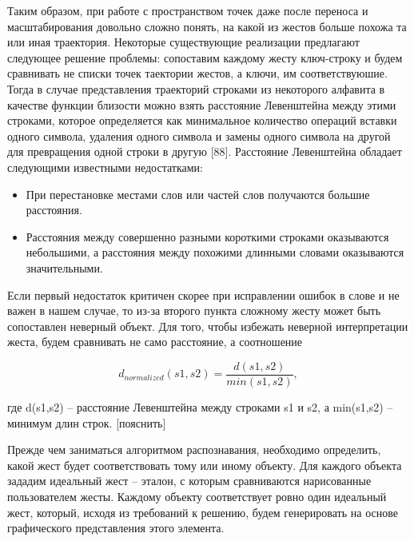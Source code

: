 \documentclass[a5paper]{article}
\begin{document}
Таким образом, при работе с пространством точек даже после переноса и масштабирования довольно сложно понять, на какой из жестов 
больше похожа та или иная траектория. Некоторые существующие реализации предлагают следующее решение проблемы: сопоставим каждому жесту 
ключ-строку и будем сравнивать не списки точек таектории жестов, а ключи, им соответствуюшие. Тогда в случае представления траекторий 
строками из некоторого алфавита в качестве функции близости можно взять расстояние Левенштейна 
между этими строками, которое определяется как минимальное количество операций вставки одного символа, удаления одного символа и замены 
одного символа на другой для превращения одной строки в другую [88]. Расстояние Левенштейна обладает следующими известными недостатками:
\begin{itemize}
  \item При перестановке местами слов или частей слов получаются большие расстояния.
  \item Расстояния между совершенно разными короткими строками оказываются небольшими, а расстояния между похожими длинными словами 
оказываются значительными.
\end{itemize}
Если первый недостаток критичен скорее при исправлении ошибок в слове и не важен в нашем случае, то из-за второго пункта сложному 
жесту может быть сопоставлен неверный объект. Для того, чтобы избежать неверной интерпретации жеста, будем сравнивать не само расстояние, 
а соотношение 

\begin{equation}
\label{levenshtein}
d_{normalized}(s1,s2) = \frac{d(s1,s2)}{min(s1,s2)},
\end{equation}

где d(s1,s2) -- расстояние Левенштейна между строками s1 и s2, а min(s1,s2) -- минимум длин строк. [пояснить]

Прежде чем заниматься алгоритмом распознавания, необходимо определить, какой жест будет соответствовать тому или иному объекту. Для каждого 
объекта зададим идеальный жест -- эталон, с которым сравниваются нарисованные пользователем жесты. Каждому объекту соответствует ровно один 
идеальный жест, который, исходя из требований к решению, будем генерировать на основе графического представления этого элемента. 
\end{document}
